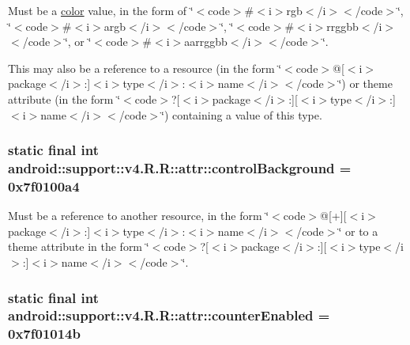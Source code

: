 Must be a \hyperlink{classandroid_1_1support_1_1v4_1_1_r_1_1color}{color} value, in the form of \char`\"{}$<$code$>$\#$<$i$>$rgb$<$/i$>$$<$/code$>$\char`\"{}, \char`\"{}$<$code$>$\#$<$i$>$argb$<$/i$>$$<$/code$>$\char`\"{}, \char`\"{}$<$code$>$\#$<$i$>$rrggbb$<$/i$>$$<$/code$>$\char`\"{}, or \char`\"{}$<$code$>$\#$<$i$>$aarrggbb$<$/i$>$$<$/code$>$\char`\"{}. 

This may also be a reference to a resource (in the form \char`\"{}$<$code$>$@\mbox{[}$<$i$>$package$<$/i$>$:\mbox{]}$<$i$>$type$<$/i$>$:$<$i$>$name$<$/i$>$$<$/code$>$\char`\"{}) or theme attribute (in the form \char`\"{}$<$code$>$?\mbox{[}$<$i$>$package$<$/i$>$:\mbox{]}\mbox{[}$<$i$>$type$<$/i$>$:\mbox{]}$<$i$>$name$<$/i$>$$<$/code$>$\char`\"{}) containing a value of this type. \hypertarget{classandroid_1_1support_1_1v4_1_1_r_1_1attr_9a051c3a68419454c2cfa24a8eb38939}{
\subsubsection[{controlBackground}]{\setlength{\rightskip}{0pt plus 5cm}static final int android::support::v4.R.R::attr::controlBackground = 0x7f0100a4}}
\label{classandroid_1_1support_1_1v4_1_1_r_1_1attr_9a051c3a68419454c2cfa24a8eb38939}


Must be a reference to another resource, in the form \char`\"{}$<$code$>$@\mbox{[}+\mbox{]}\mbox{[}$<$i$>$package$<$/i$>$:\mbox{]}$<$i$>$type$<$/i$>$:$<$i$>$name$<$/i$>$$<$/code$>$\char`\"{} or to a theme attribute in the form \char`\"{}$<$code$>$?\mbox{[}$<$i$>$package$<$/i$>$:\mbox{]}\mbox{[}$<$i$>$type$<$/i$>$:\mbox{]}$<$i$>$name$<$/i$>$$<$/code$>$\char`\"{}. \hypertarget{classandroid_1_1support_1_1v4_1_1_r_1_1attr_cfbf4bb19df110c7c8f77f68174b0528}{
\subsubsection[{counterEnabled}]{\setlength{\rightskip}{0pt plus 5cm}static final int android::support::v4.R.R::attr::counterEnabled = 0x7f01014b}}
\label{classandroid_1_1support_1_1v4_1_1_r_1_1attr_cfbf4bb19df110c7c8f77f68174b0528}



